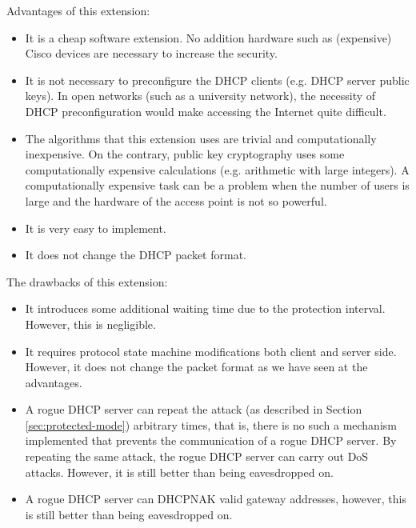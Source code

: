 \documentclass[letterpaper, 10 pt, conference]{ieeeconf}  %
\begin{document}
Advantages of this extension:
\begin{itemize}
\item It is a cheap software extension. No addition hardware such as (expensive) Cisco devices are necessary to increase the security.
\item It is not necessary to preconfigure the DHCP clients (e.g. DHCP server public keys). In open networks (such as a university network), the necessity of DHCP preconfiguration would make accessing the Internet quite difficult.
\item The algorithms that this extension uses are trivial and computationally inexpensive. On the contrary, public key cryptography uses some computationally expensive calculations (e.g. arithmetic with large integers). A computationally expensive task can be a problem when the number of users is large and the hardware of the access point is not so powerful.
\item It is very easy to implement.
\item It does not change the DHCP packet format.
\end{itemize}

The drawbacks of this extension:
\begin{itemize}
\item It introduces some additional waiting time due to the protection interval. However, this is negligible.
\item It requires protocol state machine modifications both client and server side. However, it does not change the packet format as we have seen at the advantages.
\item A rogue DHCP server can repeat the attack (as described in Section \ref{sec:protected-mode}) arbitrary times, that is, there is no such a mechanism implemented that prevents the communication of a rogue DHCP server. By repeating the same attack, the rogue DHCP server can carry out DoS attacks. However, it is still better than being eavesdropped on.
\item A rogue DHCP server can DHCPNAK valid gateway addresses, however, this is still better than being eavesdropped on.
\end{itemize}
\addtolength{\textheight}{-12cm}   %
\end{document}
